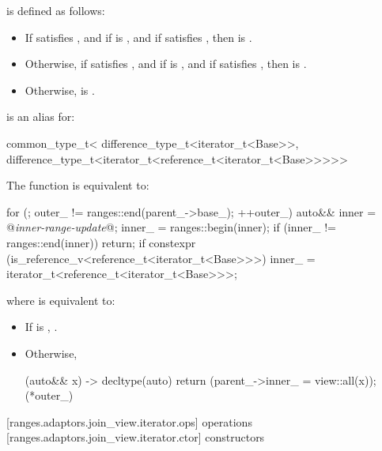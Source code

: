 \pnum
{} is defined as follows:
\begin{itemize}
\item If  satisfies , and if
 is , and if
 satisfies , then
 is .
\item Otherwise, if  satisfies , and if
 is , and if
 satisfies , then
 is .
\item Otherwise,  is .
\end{itemize}

\pnum
{} is an alias for:
\begin{codeblock}
common_type_t<
  difference_type_t<iterator_t<Base>>,
  difference_type_t<iterator_t<reference_t<iterator_t<Base>>>>>
\end{codeblock}

\pnum
The  function is equivalent to:
\begin{codeblock}
for (; outer_ != ranges::end(parent_->base_); ++outer_) {
  auto&& inner = @\textit{inner-range-update}@;
  inner_ = ranges::begin(inner);
  if (inner_ != ranges::end(inner))
    return;
}
if constexpr (is_reference_v<reference_t<iterator_t<Base>>>)
  inner_ = iterator_t<reference_t<iterator_t<Base>>>{};
\end{codeblock}

where  is equivalent to:
\begin{itemize}
\item If  is ,
.
\item Otherwise,
\begin{codeblock}
[this](auto&& x) -> decltype(auto) {
  return (parent_->inner_ = view::all(x));
}(*outer_)
\end{codeblock}
\end{itemize}

[ranges.adaptors.join_view.iterator.ops]{ operations}
[ranges.adaptors.join_view.iterator.ctor]{ constructors}

